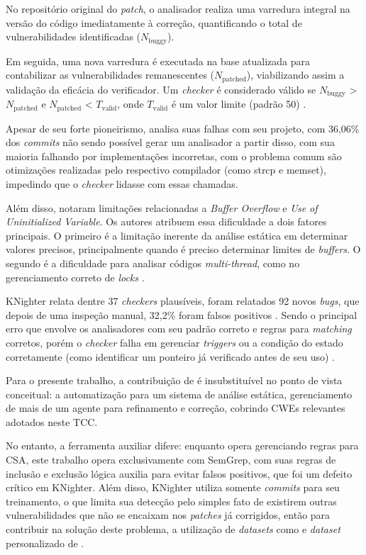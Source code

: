 \documentclass[
    12pt,                %
    openright,           %
    oneside,             %
    a4paper,             %
    english,             %
    brazil               %
]{abntex2}
\begin{document}
\begin{itemize}
No repositório original do \textit{patch}, o analisador realiza uma varredura integral na versão do código imediatamente à correção, quantificando o total de vulnerabilidades identificadas ($N_{\text{buggy}}$).
\par
Em seguida, uma nova varredura é executada na base atualizada para contabilizar as vulnerabilidades remanescentes ($N_{\text{patched}}$), viabilizando assim a validação da eficácia do verificador.
Um \textit{checker} é considerado válido se $N_{\text{buggy}}$ > $N_{\text{patched}}$ e $N_{\text{patched}}$ < $T_{\text{valid}}$, onde $T_{\text{valid}}$ é um valor limite (padrão 50) \cite{yang2025knighter}.
\par 
Apesar de seu forte pioneirismo,  analisa suas falhas com seu projeto, com 36,06\% dos \textit{commits} não sendo possível gerar um analisador a partir disso, com sua maioria falhando por implementações incorretas, com o problema comum são otimizações realizadas pelo respectivo compilador (como strcp e memset), impedindo que o \textit{checker} lidasse com essas chamadas.
\par
Além disso, notaram limitações relacionadas a \textit{Buffer Overflow} e \textit{Use of Uninitialized Variable}.
Os autores atribuem essa dificuldade a dois fatores principais.
O primeiro é a limitação inerente da análise estática em determinar valores precisos, principalmente quando é preciso determinar limites de \textit{buffers}.
O segundo é a dificuldade para analisar códigos \textit{multi-thread}, como no gerenciamento correto de \textit{locks} \cite{yang2025knighter}. 
\par 
KNighter relata dentre 37 \textit{checkers} plausíveis, foram relatados 92 novos \textit{bugs}, que depois de uma inspeção manual, 32,2\% foram falsos positivos \cite{yang2025knighter}.
Sendo o principal erro que envolve os analisadores com seu padrão correto e regras para \textit{matching} corretos, porém o \textit{checker} falha em gerenciar \textit{triggers} ou a condição do estado corretamente (como identificar um ponteiro já verificado antes de seu uso) \cite{yang2025knighter}.
\par
Para o presente trabalho, a contribuição de  é insubstituível no ponto de vista conceitual: a automatização para um sistema de análise estática, gerenciamento de mais de um agente para refinamento e correção, cobrindo CWEs relevantes adotados neste TCC.
\par
No entanto, a ferramenta auxiliar difere: enquanto  opera gerenciando regras para CSA, este trabalho opera exclusivamente com SemGrep, com suas regras de inclusão e exclusão lógica auxilia para evitar falsos positivos, que foi um defeito crítico em KNighter.
Além disso, KNighter utiliza somente \textit{commits} para seu treinamento, o que limita sua detecção pelo simples fato de existirem outras vulnerabilidades que não se encaixam nos \textit{patches} já corrigidos, então para contribuir na solução deste problema, a utilização de \textit{datasets} como  e \textit{dataset} personalizado de . 


\end{itemize}
\end{document}

